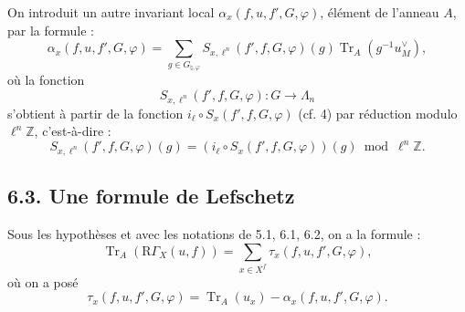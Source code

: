 \documentclass[11pt]{article}
\newcommand{\R}{\mathrm{R}}\newcommand{\RHomCore}{\mathrm{RHom}}
\providecommand{\Tr}{\operatorname{Tr}}
\providecommand{\Tr}{\operatorname{Tr}}
\providecommand{\Tr}{\operatorname{Tr}}
\providecommand{\R}{\mathrm R}
\providecommand{\Tr}{\operatorname{Tr}}
\providecommand{\RG}{\R\Gamma}
\providecommand{\La}{\Lambda}
\providecommand{\bZ}{\mathbb Z}
\providecommand{\Tr}{\operatorname{Tr}}
\begin{document}
On introduit un autre invariant local $\alpha_x(f,u,f',G,\varphi)$, élément de l'anneau $A$, par la formule :
\begin{equation}\tag{6.2.2}
\alpha_x(f,u,f',G,\varphi)=
\sum_{g\in G_{\natural,\varphi}}
S_{x,\ell^n}(f',f,G,\varphi)(g)\Tr_A(g^{-1}u_M^\vee),
\end{equation}
où la fonction
\[
S_{x,\ell^n}(f',f,G,\varphi):G\longrightarrow\La_n
\]
s'obtient à partir de la fonction $i_\ell\circ S_x(f',f,G,\varphi)$ (cf. 4) par réduction modulo $\ell^n\bZ$, c'est-à-dire :%
\[
S_{x,\ell^n}(f',f,G,\varphi)(g)=
(i_\ell\circ S_x(f',f,G,\varphi))(g)\bmod \ell^n\bZ.
\]

\subsection*{6.3. Une formule de Lefschetz}
Sous les hypothèses et avec les notations de 5.1, 6.1, 6.2, on a la formule :
\begin{equation}
\tag{6.3.1}
\Tr_A(\RG_X(u,f))=\sum_{x\in X^f}\tau_x(f,u,f',G,\varphi),
\end{equation}
où on a posé
\begin{equation}
\tag{6.3.2}
\tau_x(f,u,f',G,\varphi)=\Tr_A(u_x)-\alpha_x(f,u,f',G,\varphi).
\end{equation}
\end{document}
